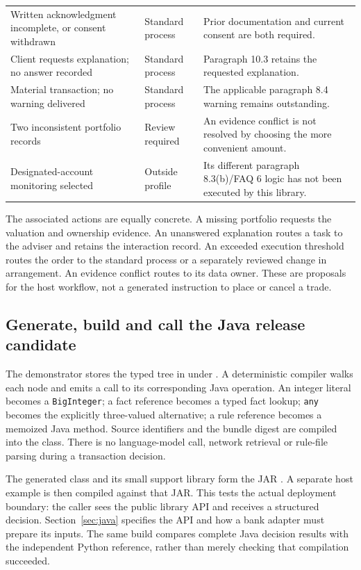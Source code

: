 \documentclass[12pt,a4paper,oneside,openany]{book}
\begin{document}
\begin{longtable}{P{0.38\textwidth}P{0.19\textwidth}P{0.33\textwidth}}
Written acknowledgment incomplete, or consent withdrawn & Standard process & Prior documentation and current consent are both required.\\
Client requests explanation; no answer recorded & Standard process & Paragraph 10.3 retains the requested explanation.\\
Material transaction; no warning delivered & Standard process & The applicable paragraph 8.4 warning remains outstanding.\\
Two inconsistent portfolio records & Review required & An evidence conflict is not resolved by choosing the more convenient amount.\\
Designated-account monitoring selected & Outside profile & Its different paragraph 8.3(b)/FAQ 6 logic has not been executed by this library.\\
\bottomrule
\end{longtable}
\endgroup

The associated actions are equally concrete. A missing portfolio requests the
valuation and ownership evidence. An unanswered explanation routes a task to the
adviser and retains the interaction record. An exceeded execution threshold
routes the order to the standard process or a separately reviewed change in
arrangement. An evidence conflict routes to its data owner. These are proposals
for the host workflow, not a generated instruction to place or cancel a trade.

\subsection{Generate, build and call the Java release candidate}
\label{merge:P-01b-complete-dry-run:05}


The demonstrator stores the typed tree in 
under . A deterministic
compiler walks each node and emits a call to its corresponding Java operation.
An integer literal becomes a \texttt{BigInteger}; a fact reference becomes a
typed fact lookup; \texttt{any} becomes the explicitly three-valued alternative;
a rule reference becomes a memoized Java method. Source identifiers and the
bundle digest are compiled into the class. There is no language-model call,
network retrieval or rule-file parsing during a transaction decision.

The generated class and its small support library form the JAR
. A separate host example is
then compiled against that JAR. This tests the actual deployment boundary:
the caller sees the public library API and receives a structured decision.
Section~\ref{sec:java} specifies the API and how a bank adapter must prepare
its inputs. The same build compares complete Java decision results with the
independent Python reference, rather than merely checking that compilation
succeeded.
\end{document}
